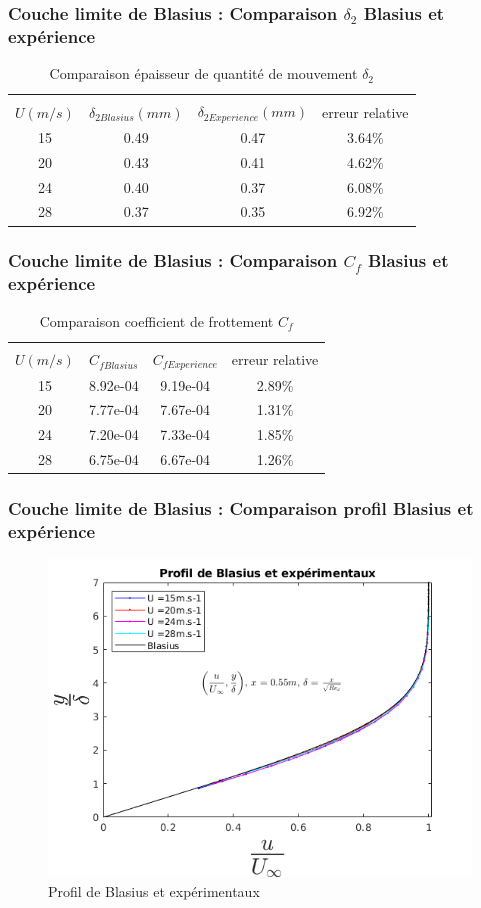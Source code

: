 \documentclass{beamer}
\begin{document}
\begin{frame}
\frametitle{Couche limite de Blasius : Comparaison $\delta_{2}$ Blasius et expérience}
\begin{table}[ht]
	\centering
	\begin{tabular}{cccc}
		\hline\\
		$U(m/s)$ & $\delta_{2Blasius}(mm)$ &
		$ \delta_{2Experience}(mm)$ & 
		 erreur relative\\
		\hline
   15 & 0.49   & 0.47   & 3.64\%\\
   20 & 0.43   & 0.41   & 4.62\%\\
   24 & 0.40   & 0.37   & 6.08\%\\
   28 & 0.37   & 0.35   & 6.92\%
	\end{tabular}
	\caption{Comparaison épaisseur de quantité de mouvement $\delta_{2}$}
\end{table}
\end{frame}

\begin{frame}
\frametitle{Couche limite de Blasius : Comparaison $C_{f}$ Blasius et expérience}
\begin{table}[ht]
	\centering
	\begin{tabular}{cccc}
		\hline\\
		$U(m/s)$ & $C_{fBlasius}$ &
		$ C_{fExperience}$ & 
		 erreur relative\\
		\hline
   15 & 8.92e-04   & 9.19e-04   & 2.89\%\\
   20 & 7.77e-04   & 7.67e-04   & 1.31\%\\
   24 & 7.20e-04   & 7.33e-04   & 1.85\%\\
   28 & 6.75e-04   & 6.67e-04   & 1.26\%
	\end{tabular}
	\caption{Comparaison coefficient de frottement $C_{f}$}
\end{table}
\end{frame}

\begin{frame}
\frametitle{Couche limite de Blasius : Comparaison profil Blasius et expérience}
\begin{figure}[ht]
	\centering
	\includegraphics[scale = 0.5]{./image/Bla.png}
	\caption{Profil de Blasius et expérimentaux}
\end{figure}
\end{frame}
\end{document}
